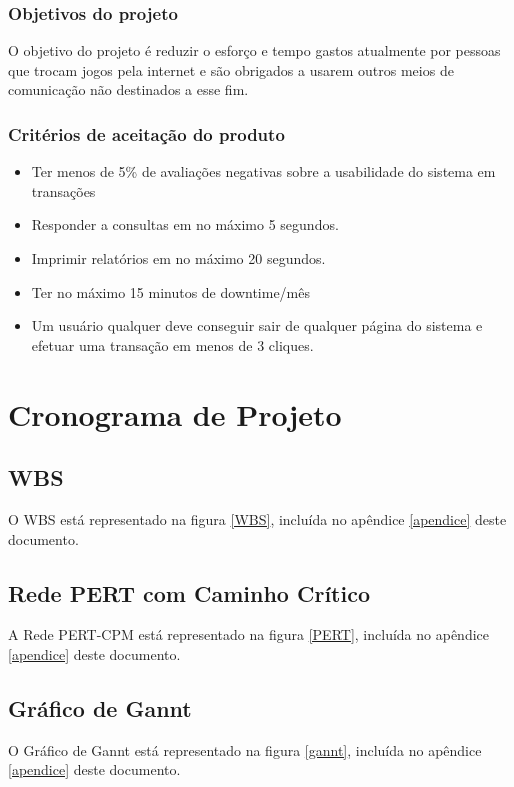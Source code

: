 \documentclass[a4paper,11pt]{article}
\begin{document}
		\subsubsection{Objetivos do projeto}
			O objetivo do projeto é reduzir o esforço e tempo gastos atualmente por pessoas que trocam jogos pela internet e são obrigados a usarem outros meios de comunicação não destinados a esse fim.
		\newpage
		\subsubsection{Critérios de aceitação do produto}
			\begin{itemize}
				\item Ter menos de 5\% de avaliações negativas sobre a usabilidade do sistema em transações
				\item Responder a consultas em no máximo 5 segundos.
				\item Imprimir relatórios em no máximo 20 segundos.
				\item Ter no máximo 15 minutos de downtime/mês
				\item Um usuário qualquer deve conseguir sair de qualquer página do sistema e efetuar uma transação em menos de 3 cliques.
			\end{itemize}
	
\section{Cronograma de Projeto}
	\subsection{WBS}
    	O WBS está representado na figura \ref{WBS}, incluída no apêndice \ref{apendice} deste documento.
	\subsection{Rede PERT com Caminho Crítico}
		A Rede PERT-CPM está representado na figura \ref{PERT}, incluída no apêndice \ref{apendice} deste documento.
	\subsection{Gráfico de Gannt}
		O Gráfico de Gannt está representado na figura \ref{gannt}, incluída no apêndice \ref{apendice} deste documento.
\end{document}

